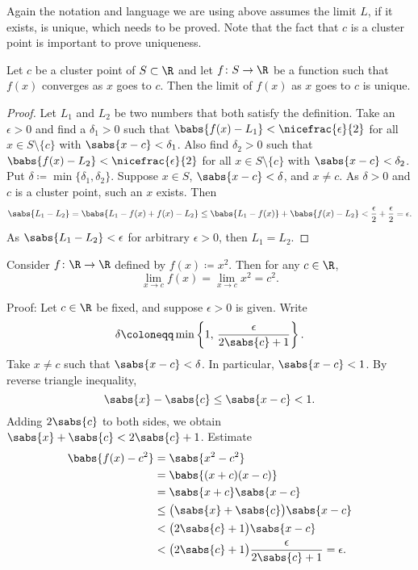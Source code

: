 Again the notation and language we are using above assumes the limit $L$, if
it exists, is unique, which needs to be proved.  Note that the fact that $c$
is a cluster point is important to prove uniqueness.

\begin{prop}
Let $c$ be a cluster point of $S \subset \R$ and let $f \colon S \to \R$
be a function such that $f(x)$ converges as $x$ goes to $c$.  Then
the limit of $f(x)$ as $x$ goes to $c$ is unique.
\end{prop}

\begin{proof}
Let $L_1$ and $L_2$ be two numbers that both satisfy the definition.
Take an $\epsilon > 0$ and find a $\delta_1 > 0$ such that
$\babs{f(x)-L_1} < \nicefrac{\epsilon}{2}$ 
for all $x \in S \setminus \{c\}$ with $\sabs{x-c} < \delta_1$.
Also find $\delta_2 > 0$ such that
$\babs{f(x)-L_2} < \nicefrac{\epsilon}{2}$
for all $x \in S \setminus \{c\}$ with $\sabs{x-c} < \delta_2$.
Put $\delta \coloneqq \min \{ \delta_1, \delta_2 \}$.  Suppose $x \in S$,
$\sabs{x-c} < \delta$, and $x \not= c$.  As $\delta > 0$ and $c$ is a cluster
point, such an $x$ exists.  Then
\begin{equation*}
\sabs{L_1 - L_2} =
\babs{L_1 - f(x) + f(x) - L_2} \leq
\babs{L_1 - f(x)} + \babs{f(x) - L_2} < \frac{\epsilon}{2} + \frac{\epsilon}{2}
= \epsilon.
\end{equation*}
As $\sabs{L_1-L_2} < \epsilon$ for arbitrary $\epsilon > 0$, then
$L_1 = L_2$.
\end{proof}

\begin{example}
Consider $f \colon \R \to \R$ defined by $f(x) \coloneqq x^2$.  Then
for any $c \in \R$,
\begin{equation*}
\lim_{x\to c} f(x) = \lim_{x\to c} x^2 = c^2 .
\end{equation*}

Proof: Let $c \in \R$ be fixed, and suppose $\epsilon > 0$ is given.  Write
\begin{equation*}
\delta \coloneqq \min \left\{ 1 , \, \frac{\epsilon}{2\sabs{c}+1} \right\} .
\end{equation*}
Take $x \not= c$ such that $\sabs{x-c} < \delta$.  In particular,
$\sabs{x-c} < 1$.  By reverse triangle inequality,
\begin{equation*}
\sabs{x}-\sabs{c} \leq \sabs{x-c} < 1 .
\end{equation*}
Adding $2\sabs{c}$ to both sides, we obtain
$\sabs{x} + \sabs{c} < 2\sabs{c} + 1$.  Estimate
\begin{equation*}
\begin{split}
\babs{f(x) - c^2} &= \sabs{x^2-c^2} \\
&= \babs{(x+c)(x-c)} \\
&= \sabs{x+c}\sabs{x-c} \\
&\leq \bigl(\sabs{x}+\sabs{c}\bigr)\sabs{x-c} \\
&< \bigl(2\sabs{c}+1\bigr)\sabs{x-c} \\
&< \bigl(2\sabs{c}+1\bigr)\frac{\epsilon}{2\sabs{c}+1} = \epsilon .
\end{split}
\end{equation*}
\end{example}

